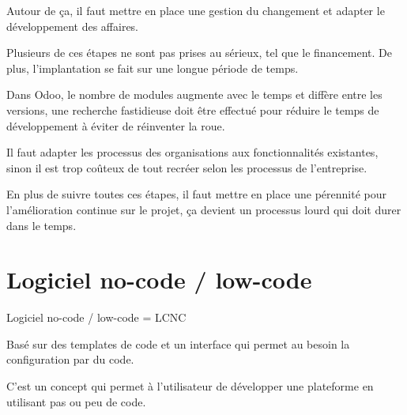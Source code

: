 Autour de ça, il faut mettre en place une gestion du changement et adapter le développement des affaires.

Plusieurs de ces étapes ne sont pas prises au sérieux, tel que le financement. De plus, l’implantation se fait sur une longue période de temps.

Dans Odoo, le nombre de modules augmente avec le temps et diffère entre les versions, une recherche fastidieuse doit être effectué pour réduire le temps de développement à éviter de réinventer la roue.

Il faut adapter les processus des organisations aux fonctionnalités existantes, sinon il est trop coûteux de tout recréer selon les processus de l’entreprise.

En plus de suivre toutes ces étapes, il faut mettre en place une pérennité pour l’amélioration continue sur le projet, ça devient un processus lourd qui doit durer dans le temps.


\section{Logiciel no-code / low-code}

Logiciel no-code / low-code = LCNC

Basé sur des templates de code et un interface qui permet au besoin la configuration par du code.

C’est un concept qui permet à l’utilisateur de développer une plateforme en utilisant pas ou peu de code.


